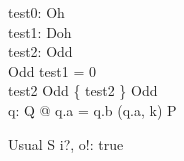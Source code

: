 \documentclass{article}
\begin{document}


\begin{axdef}
   test0: Oh \\
   test1: Doh \\
   test2: Odd \\
   \Delta Odd %
\where
   test1 = 0 
   \\
   test2 \in Odd \land \{ test2 \} \subseteq Odd
   \\
   \forall q: Q @ q.a = q.b \land (q.a, k) \in P   
\end{axdef}

\begin{schema}{Usual}
   \Delta S
   i?, o!: \nat
\where
    true
\end{schema}
\end{document}
